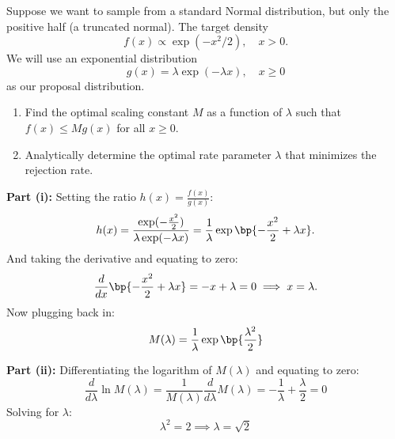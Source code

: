 \documentclass{article}
\begin{document}
\begin{homeworkProblem}

  Suppose we want to sample from a standard Normal distribution, but only the positive half (a truncated normal).
  The target density
  \[
    f(x) \propto \exp (-x^2/2), \quad x > 0.
  \]
  We will use an exponential distribution
  \[
    g(x) = \lambda \exp(-\lambda x), \quad x \geq 0
  \]
  as our proposal distribution.
  \begin{enumerate}[label=(\roman*), topsep=5pt, itemsep=5pt]
    \item Find the optimal scaling constant $M$ as a function of $\lambda$ such that $f(x) \leq M g(x)$ for all $x \geq 0$.
    \item Analytically determine the optimal rate parameter $\lambda$ that minimizes the rejection rate. \newline
  \end{enumerate}

  \solution

  \textbf{Part (i):} Setting the ratio $h(x) = \frac{f(x)}{g(x)}$:
  \[
    h(x) = \frac{\exp(-\frac{x^2}{2})}{\lambda \exp(-\lambda x)} = \frac{1}{\lambda} \exp\bp{-\frac{x^2}{2} + \lambda x}.
  \]
  And taking the derivative and equating to zero:
  \[
    \frac{d}{dx} \bp{-\frac{x^2}{2} + \lambda x} = -x + \lambda = 0 \implies x = \lambda.
  \]
  Now plugging back in:
  \[
    M(\lambda) = \frac{1}{\lambda} \exp\bp{\frac{\lambda^2}{2}}
  \]

  \textbf{Part (ii):} Differentiating the logarithm of $M(\lambda)$ and equating to zero:
  \[
    \frac{d}{d\lambda} \ln M(\lambda) = \frac{1}{M(\lambda)} \frac{d}{d\lambda} M(\lambda) = -\frac{1}{\lambda} + \frac{\lambda}{2} = 0
  \]
  Solving for $\lambda$:
  \[
    \lambda^2 = 2 \implies \lambda = \sqrt{2}
  \]

\end{homeworkProblem}

\pagebreak
\end{document}
